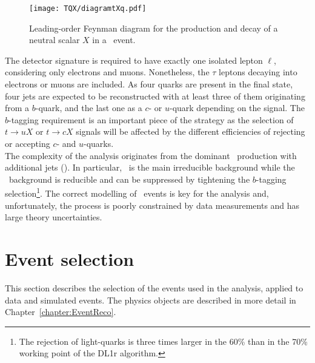 \begin{figure}[tbp]
    \RawFloats
    \begin{center}
    \texttt{[image: TQX/diagramtXq.pdf]}
    \caption{
        Leading-order Feynman diagram for the production and decay of a neutral scalar $X$ in a \ttbar\ event.
    }
    \label{tqx:feynman2}
    \end{center}
\end{figure}

The detector signature is required to have exactly one isolated lepton $\ell$, considering only electrons and muons. Nonetheless, the $\tau$ leptons decaying into electrons or muons are included. As four quarks are present in the final state, four jets are expected to be reconstructed with at least three of them originating from a $b$-quark, and the last one as a $c$- or $u$-quark depending on the signal. The $b$-tagging requirement is an important piece of the strategy as the selection of $t\to uX$ or $t\to cX$ signals will be affected by the different efficiencies of rejecting or accepting $c$- and $u$-quarks.\\

The complexity of the analysis originates from the dominant \ttbar\ production with additional jets (\ttjets). In particular, \ttb\ is the main irreducible background while the \ttl\ background is reducible and can be suppressed by tightening the $b$-tagging selection\footnote{The rejection of light-quarks is three times larger in the 60\% than in the 70\% working point of the DL1r algorithm.}. The correct modelling of \ttbar\ events is key for the analysis and, unfortunately, the process is poorly constrained by data measurements and has large theory uncertainties.\\

\section{Event selection}
\label{tqX:SectionEventSelection}
This section describes the selection of the events used in the analysis, applied to data and simulated events. The physics objects are described in more detail in Chapter~\ref{chapter:EventReco}.\\

